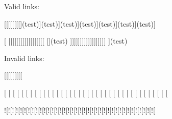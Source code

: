 Valid links\+:

\mbox{[}\mbox{[}\mbox{[}\mbox{[}\mbox{[}\mbox{[}\mbox{[}\mbox{[}\mbox{]}(test)\mbox{]}(test)\mbox{]}(test)\mbox{]}(test)\mbox{]}(test)\mbox{]}(test)\mbox{]}(test)\mbox{]}

\mbox{[} \mbox{[}\mbox{[}\mbox{[}\mbox{[}\mbox{[}\mbox{[}\mbox{[}\mbox{[}\mbox{[}\mbox{[}\mbox{[}\mbox{[}\mbox{[}\mbox{[}\mbox{[}\mbox{[}\mbox{[}\mbox{[} \mbox{[}\mbox{]}(test) \mbox{]}\mbox{]}\mbox{]}\mbox{]}\mbox{]}\mbox{]}\mbox{]}\mbox{]}\mbox{]}\mbox{]}\mbox{]}\mbox{]}\mbox{]}\mbox{]}\mbox{]}\mbox{]}\mbox{]}\mbox{]} \mbox{]}(test)

Invalid links\+:

\mbox{[}\mbox{[}\mbox{[}\mbox{[}\mbox{[}\mbox{[}\mbox{[}\mbox{[}\mbox{[}

\mbox{[} \mbox{[} \mbox{[} \mbox{[} \mbox{[} \mbox{[} \mbox{[} \mbox{[} \mbox{[} \mbox{[} \mbox{[} \mbox{[} \mbox{[} \mbox{[} \mbox{[} \mbox{[} \mbox{[} \mbox{[} \mbox{[} \mbox{[} \mbox{[} \mbox{[} \mbox{[} \mbox{[} \mbox{[} \mbox{[} \mbox{[} \mbox{[} \mbox{[} \mbox{[} \mbox{[} \mbox{[} \mbox{[} \mbox{[} \mbox{[} \mbox{[} \mbox{[} \mbox{[}

!\mbox{[}!\mbox{[}!\mbox{[}!\mbox{[}!\mbox{[}!\mbox{[}!\mbox{[}!\mbox{[}!\mbox{[}!\mbox{[}!\mbox{[}!\mbox{[}!\mbox{[}!\mbox{[}!\mbox{[}!\mbox{[}!\mbox{[}!\mbox{[}!\mbox{[}!\mbox{[}!\mbox{[}!\mbox{[}!\mbox{[}!\mbox{[}!\mbox{[}!\mbox{[}!\mbox{[}!\mbox{[}!\mbox{[}!\mbox{[}!\mbox{[}!\mbox{[}!\mbox{[}!\mbox{[}!\mbox{[}!\mbox{[}!\mbox{[}!\mbox{[} 
